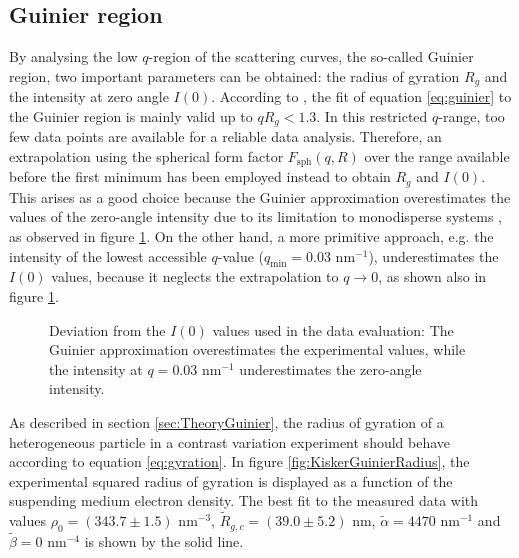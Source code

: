 \subsection{Guinier region}
\label{sec:guinier_analysis}
By analysing the low \(q \)-region of the scattering curves, the so-called Guinier region, two important parameters can be obtained: the radius of gyration \(R_g\) and the intensity at zero angle \(I(0)\). According to \cite{feigin_structure_1987}, the fit of equation \eqref{eq:guinier} to the Guinier region is mainly valid up to \( qR_g<1.3 \). In this restricted \(q\)-range, too few data points are available for a reliable data analysis. Therefore, an extrapolation using the spherical form factor \( F_{\text{sph}}(q,R) \) over the range available before the first minimum has been employed instead to obtain \(R_g\) and \(I(0)\). This arises as a good choice because the Guinier approximation overestimates the values of the zero-angle intensity due to its limitation to monodisperse systems \citep{feigin_structure_1987}, as observed in figure \ref{fig:KiskerIntensityComparison}. On the other hand, a more primitive approach, e.g. the intensity of the lowest accessible $q$-value ($q_{\text{min}}=0.03$ nm$^{-1}$), underestimates the $I(0)$ values, because it neglects the extrapolation to $q\rightarrow0$, as shown also in figure \ref{fig:KiskerIntensityComparison}.

\begin{figure}%
	\centering
		
		\caption[Deviation from the $I(0)$ used in the evaluation of the PS-COOH particles experimental data.]{Deviation from the $I(0)$ values used in the data evaluation: The Guinier approximation overestimates the experimental values, while the intensity at $q=0.03$ nm$^{-1}$ underestimates the zero-angle intensity.}
		\label{fig:KiskerIntensityComparison}
\end{figure}

As described in section \ref{sec:TheoryGuinier}, the radius of gyration of a heterogeneous particle in a contrast variation experiment should behave according to equation \eqref{eq:gyration}. In figure \ref{fig:KiskerGuinierRadius}, the experimental squared radius of gyration is displayed as a function of the suspending medium electron density. The best fit to the measured data with values \(\rho_0=\left(343.7\pm1.5\right)\) nm\(^{-3}\), \( \tilde R_{g,c}=\left(39.0\pm5.2\right)\) nm, \(\tilde \alpha=4470\) nm\(^{-1}\) and \(\tilde\beta=0\) nm\(^{-4}\) is shown by the solid line. 


